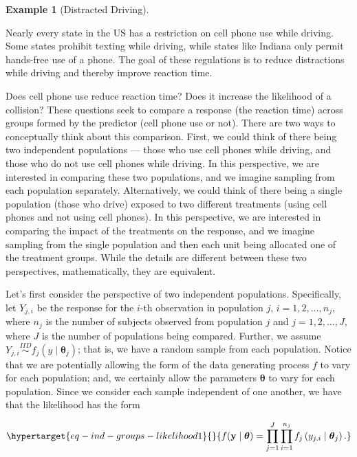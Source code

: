 \documentclass[
  letterpaper,
  DIV=11,
  numbers=noendperiod]{scrreprt}
\theoremstyle{definition}
\theoremstyle{plain}
\theoremstyle{definition}
\newtheorem{example}{Example}[chapter]
\theoremstyle{remark}
\begin{document}
\begin{example}[Distracted
Driving]\protect\hypertarget{exm-distracted-driving}{}\label{exm-distracted-driving}

Nearly every state in the US has a restriction on cell phone use while
driving. Some states prohibit texting while driving, while states like
Indiana only permit hands-free use of a phone. The goal of these
regulations is to reduce distractions while driving and thereby improve
reaction time.

\end{example}

Does cell phone use reduce reaction time? Does it increase the
likelihood of a collision? These questions seek to compare a response
(the reaction time) across groups formed by the predictor (cell phone
use or not). There are two ways to conceptually think about this
comparison. First, we could think of there being two independent
populations --- those who use cell phones while driving, and those who
do not use cell phones while driving. In this perspective, we are
interested in comparing these two populations, and we imagine sampling
from each population separately. Alternatively, we could think of there
being a single population (those who drive) exposed to two different
treatments (using cell phones and not using cell phones). In this
perspective, we are interested in comparing the impact of the treatments
on the response, and we imagine sampling from the single population and
then each unit being allocated one of the treatment groups. While the
details are different between these two perspectives, mathematically,
they are equivalent.

Let's first consider the perspective of two independent populations.
Specifically, let \(Y_{j,i}\) be the response for the \(i\)-th
observation in population \(j\), \(i = 1, 2, \dotsc, n_j\), where
\(n_j\) is the number of subjects observed from population \(j\) and
\(j = 1, 2, \dotsc, J\), where \(J\) is the number of populations being
compared. Further, we assume
\(Y_{j, i} \stackrel{IID}{\sim} f_j\left(y \mid \boldsymbol{\theta}_j\right)\);
that is, we have a random sample from each population. Notice that we
are potentially allowing the form of the data generating process \(f\)
to vary for each population; and, we certainly allow the parameters
\(\boldsymbol{\theta}\) to vary for each population. Since we consider
each sample independent of one another, we have that the likelihood has
the form

\begin{equation}\protect\hypertarget{eq-ind-groups-likelihood1}{}{f(\mathbf{y} \mid \boldsymbol{\theta}) = \prod_{j=1}^{J} \prod_{i=1}^{n_j} f_j\left(y_{j, i} \mid \boldsymbol{\theta}_j\right).}\label{eq-ind-groups-likelihood1}\end{equation}
\end{document}
